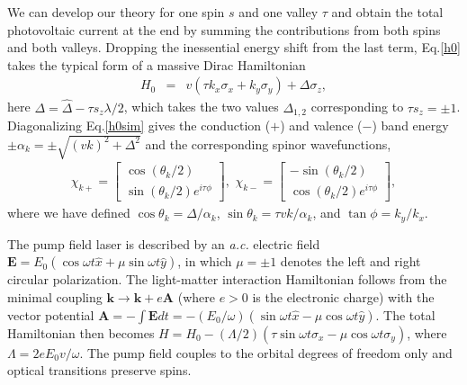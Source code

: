 \documentclass[reprint,amsmath,amssymb,aps,prb]{revtex4-1}
\begin{document}
We can develop our theory for one spin $s$ and one valley $\tau$ and obtain the total photovoltaic current at the end by summing the contributions from both spins and both valleys. Dropping the inessential energy shift from the last term, Eq.\eqref{h0} takes the typical form of a massive Dirac Hamiltonian 
%
\begin{eqnarray}
H_0 & =& v(\tau  k_x\sigma_x + k_y\sigma_y) +\Delta \sigma_z, \label{h0sim}
\end{eqnarray}
%
here $\Delta = \hat{\Delta}-\tau s_z{\lambda}/2$, which takes the two values $\Delta_{1,2}$ corresponding to $\tau s_z = \pm 1$. 
Diagonalizing Eq.\eqref{h0sim} gives the conduction ($+$) and valence ($-$) band energy $\pm \alpha_k = \pm \sqrt{(v k)^2+\Delta^2}$ and the corresponding spinor wavefunctions,
%
\begin{eqnarray} \label{spinors}
\chi_{k+}=\begin{bmatrix} \cos({\theta_k}/{2}) \\ \sin({\theta_k}/{2}) e^{i \tau \phi} \end{bmatrix},\,\, \chi_{k-}=\begin{bmatrix} -\sin({\theta_k}/{2}) \\ \cos({\theta_k}/{2}) e^{i \tau \phi} \end{bmatrix},
\end{eqnarray}
%
where we have defined $\cos\theta_k =\Delta/\alpha_k$, $\sin\theta_k=\tau v k/\alpha_k$, and $\tan\phi=k_y/k_x$. 

The pump field laser is described by an \textit{a.c.} electric field $\bm{E} = E_0(\cos\omega t\hat{x}+\mu\sin\omega t\hat{y})$, in which $\mu=\pm1$ denotes the left and right circular polarization. The light-matter interaction Hamiltonian follows from the minimal coupling $\bm{k} \to \bm{k}+e\bm{A}$ (where $e > 0$ is the electronic charge) with the vector potential $\bm{A}=-\int\bm{E}dt=-(E_0/\omega)(\sin\omega t \hat{x}-\mu\cos\omega t\hat{y})$. The total Hamiltonian then becomes $H = H_0-(\Lambda/2)(\tau\sin\omega t\sigma_x-\mu\cos\omega t\sigma_y)$, where $\Lambda=2eE_0v/\omega$. The pump field couples to the orbital degrees of freedom only and optical transitions preserve spins. 
\end{document}
